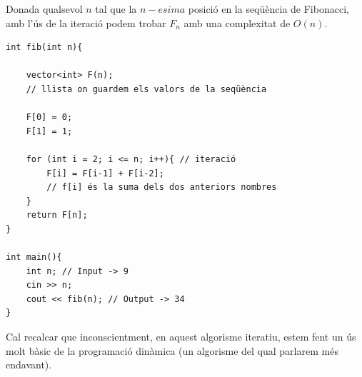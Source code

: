 Donada qualsevol $n$ tal que la $n-esima$ posició en la seqüència de Fibonacci, amb l'ús de la iteració podem trobar $F_n$ amb una complexitat de $O(n)$.

\newpage

\begin{lstlisting}
int fib(int n){

    vector<int> F(n);
    // llista on guardem els valors de la seqüència

    F[0] = 0;
    F[1] = 1;

    for (int i = 2; i <= n; i++){ // iteració
        F[i] = F[i-1] + F[i-2];
        // f[i] és la suma dels dos anteriors nombres
    }
    return F[n];
}

int main(){
    int n; // Input -> 9
    cin >> n;
    cout << fib(n); // Output -> 34
}
\end{lstlisting}

Cal recalcar que inconscientment, en aquest algorisme iteratiu, estem fent un ús molt bàsic de la programació dinàmica (un algorisme del qual parlarem més endavant).

